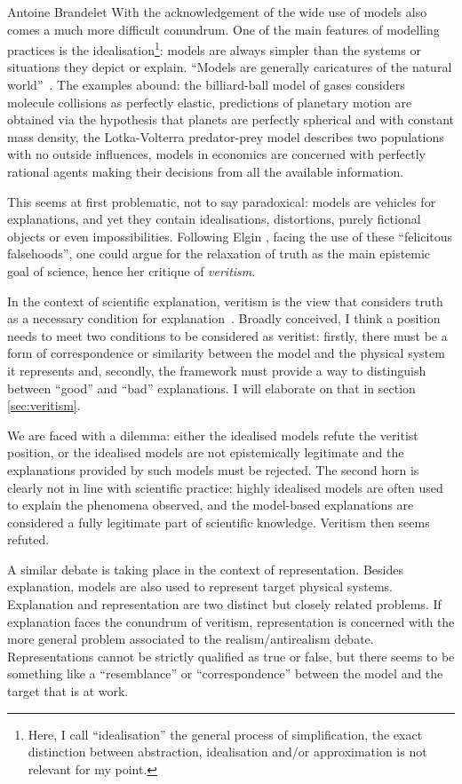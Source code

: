 \begin{artengenv}{Antoine Brandelet}
With the acknowledgement of the wide use of models also comes a much more difficult conundrum. One of the main features of modelling practices is the idealisation\footnote{Here, I call ``idealisation'' the general process of simplification, the exact distinction between abstraction, idealisation and/or approximation is not relevant for my point.}: models are always simpler than the systems or situations they depict or explain. ``Models are generally caricatures of the natural world''~\parencite{Chakravartty2001}. The examples abound: the billiard-ball model of gases considers molecule collisions as perfectly elastic, predictions of planetary motion are obtained via the hypothesis that planets are perfectly spherical and with constant mass density, the Lotka-Volterra predator-prey model describes two populations with no outside influences, models in economics are concerned with perfectly rational agents making their decisions from all the available information.

This seems at first problematic, not to say paradoxical: models are vehicles for explanations, and yet they contain idealisations, distortions, purely fictional objects or even impossibilities. Following Elgin \parencite*{Elgin2017}, facing the use of these ``felicitous falsehoods'', one could argue for the relaxation of truth as the main epistemic goal of science, hence her critique of \textit{veritism}.

In the context of scientific explanation, veritism is the view that considers truth as a necessary condition for explanation~\parencite{Pincock2021}. Broadly conceived, I think a position needs to meet two conditions to be considered as veritist: firstly, there must be a form of correspondence or similarity between the model and the physical system it represents and, secondly, the framework must provide a way to distinguish between ``good'' and ``bad'' explanations. I will elaborate on that in section \ref{sec:veritism}.

We are faced with a dilemma: either the idealised models refute the veritist position, or the idealised models are not epistemically legitimate and the explanations provided by such models must be rejected. The second horn is clearly not in line with scientific practice: highly idealised models are often used to explain the phenomena observed, and the model-based explanations are considered a fully legitimate part of scientific knowledge. Veritism then seems refuted.

A similar debate is taking place in the context of representation. Besides explanation, models are also used to represent target physical systems. Explanation and representation are two distinct but closely related problems. If explanation faces the conundrum of veritism, representation is concerned with the more general problem associated to the realism/antirealism debate. Representations cannot be strictly qualified as true or false, but there seems to be something like a ``resemblance'' or ``correspondence'' between the model and the target that is at work.


\end{artengenv}
